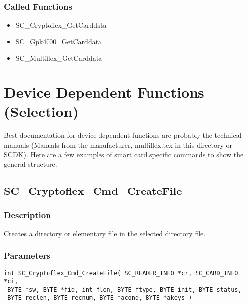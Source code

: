 \documentclass[a4paper,oneside]{article}
\begin{document}
\subsubsection*{Called Functions}

\begin{itemize}
\item SC\_Cryptoflex\_GetCarddata
\item SC\_Gpk4000\_GetCarddata
\item SC\_Multiflex\_GetCarddata
\end{itemize}


\section{Device Dependent Functions (Selection)}

Best documentation for device dependent functions are probably the
technical manuals (Manuals from the manufacturer, multiflex.tex in
this directory or SCDK). Here are a few examples of smart card specific
commands to show the general structure.

\subsection{SC\_Cryptoflex\_Cmd\_CreateFile}

\subsubsection*{Description}

Creates a directory or elementary file in the selected directory
file.

\subsubsection*{Parameters}

\begin{verbatim}
int SC_Cryptoflex_Cmd_CreateFile( SC_READER_INFO *cr, SC_CARD_INFO *ci,
 BYTE *sw, BYTE *fid, int flen, BYTE ftype, BYTE init, BYTE status,
 BYTE reclen, BYTE recnum, BYTE *acond, BYTE *akeys )
\end{verbatim}
\end{document}
